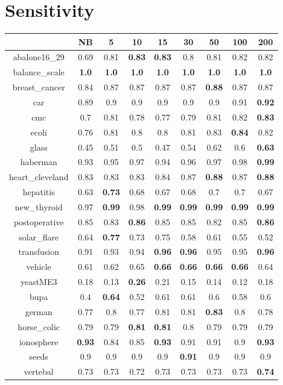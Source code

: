 \documentclass{article}%
\begin{document}
%
\section*{Sensitivity}%
\begin{tabular}{c|cccccccc}%
\hline%
&NB&5&10&15&30&50&100&200\\%
\hline%
abalone16\_29&0.69&0.81&\textbf{0.83}&\textbf{0.83}&0.8&0.81&0.82&0.82\\%
\hline%
balance\_scale&\textbf{1.0}&\textbf{1.0}&\textbf{1.0}&\textbf{1.0}&\textbf{1.0}&\textbf{1.0}&\textbf{1.0}&\textbf{1.0}\\%
\hline%
breast\_cancer&0.84&0.87&0.87&0.87&0.87&\textbf{0.88}&0.87&0.87\\%
\hline%
car&0.89&0.9&0.9&0.9&0.9&0.9&0.91&\textbf{0.92}\\%
\hline%
cmc&0.7&0.81&0.78&0.77&0.79&0.81&0.82&\textbf{0.83}\\%
\hline%
ecoli&0.76&0.81&0.8&0.8&0.81&0.83&\textbf{0.84}&0.82\\%
\hline%
glass&0.45&0.51&0.5&0.47&0.54&0.62&0.6&\textbf{0.63}\\%
\hline%
haberman&0.93&0.95&0.97&0.94&0.96&0.97&0.98&\textbf{0.99}\\%
\hline%
heart\_cleveland&0.83&0.83&0.83&0.84&0.87&\textbf{0.88}&0.87&\textbf{0.88}\\%
\hline%
hepatitis&0.63&\textbf{0.73}&0.68&0.67&0.68&0.7&0.7&0.67\\%
\hline%
new\_thyroid&0.97&\textbf{0.99}&0.98&\textbf{0.99}&\textbf{0.99}&\textbf{0.99}&\textbf{0.99}&\textbf{0.99}\\%
\hline%
postoperative&0.85&0.83&\textbf{0.86}&0.85&0.85&0.82&0.85&\textbf{0.86}\\%
\hline%
solar\_flare&0.64&\textbf{0.77}&0.73&0.75&0.58&0.61&0.55&0.52\\%
\hline%
transfusion&0.91&0.93&0.94&\textbf{0.96}&\textbf{0.96}&0.95&0.95&\textbf{0.96}\\%
\hline%
vehicle&0.61&0.62&0.65&\textbf{0.66}&\textbf{0.66}&\textbf{0.66}&\textbf{0.66}&0.64\\%
\hline%
yeastME3&0.18&0.13&\textbf{0.26}&0.21&0.15&0.14&0.12&0.18\\%
\hline%
bupa&0.4&\textbf{0.64}&0.52&0.61&0.61&0.6&0.58&0.6\\%
\hline%
german&0.77&0.8&0.77&0.81&0.81&\textbf{0.83}&0.8&0.78\\%
\hline%
horse\_colic&0.79&0.79&\textbf{0.81}&\textbf{0.81}&0.8&0.79&0.79&0.79\\%
\hline%
ionosphere&\textbf{0.93}&0.84&0.85&\textbf{0.93}&0.91&0.91&0.9&\textbf{0.93}\\%
\hline%
seeds&0.9&0.9&0.9&0.9&\textbf{0.91}&0.9&0.9&0.9\\%
\hline%
vertebal&0.73&0.73&0.72&0.73&0.73&0.73&0.73&\textbf{0.74}\\%
\hline%
\end{tabular}
\end{document}
